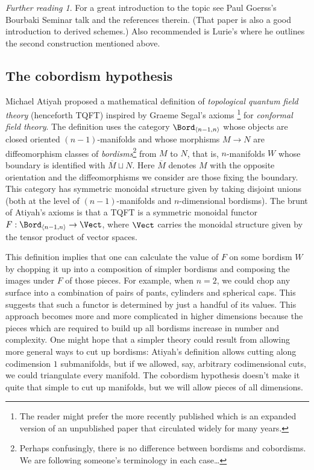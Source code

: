 \documentclass{conm-p-l}
\theoremstyle{definition} \newtheorem{definition}[theorem]{Definition}
\theoremstyle{remark} \newtheorem{remark}[theorem]{Remark}
\newtheorem*{further}{Further reading}
\numberwithin{equation}{section}
\begin{document}
\begin{further}
  For a great introduction to the topic see Paul Goerss's
  Bourbaki Seminar talk \cite{Goerss} and the references therein.
  (That paper is also a good introduction to derived schemes.)
  Also recommended is Lurie's \cite{LurieTMF} where he outlines the
  second construction mentioned above.
\end{further}


\subsection{The cobordism hypothesis}

Michael Atiyah \cite{Atiyah} proposed a mathematical definition of
\emph{topological quantum field theory} (henceforth TQFT) inspired by
Graeme Segal's axioms \cite{SegalCFT}\footnote{The reader might prefer
  the more recently published \cite{SegalCFT2} which is an expanded
  version of an unpublished paper that circulated widely for many
  years.} for \emph{conformal field theory}. The definition uses the
category $\Bord_{\langle n-1,n\rangle}$ whose objects are closed
oriented $(n-1)$-manifolds and whose morphisms $M \to N$ are
diffeomorphism classes of \emph{bordisms}\footnote{Perhaps
  confusingly, there is no difference between bordisms and
  cobordisms. We are following someone's terminology in each
  case\dots} from $M$ to $N$, that is, $n$-manifolds $W$ whose
boundary is identified with $\overline{M} \sqcup N$. Here
$\overline{M}$ denotes $M$ with the opposite orientation and the
diffeomorphisms we consider are those fixing the boundary.  This
category has symmetric monoidal structure given by taking disjoint
unions (both at the level of $(n-1)$-manifolds and $n$-dimensional
bordisms). The brunt of Atiyah's axioms is that a TQFT is a symmetric
monoidal functor $F : \Bord_{\langle n-1, n\rangle} \to \Vect$, where
$\Vect$ carries the monoidal structure given by the tensor product of
vector spaces.

This definition implies that one can calculate the value of $F$ on
some bordism $W$ by chopping it up into a composition of simpler
bordisms and composing the images under $F$ of those pieces. For
example, when $n=2$, we could chop any surface into a combination of
pairs of pants, cylinders and spherical caps. This suggests that such
a functor is determined by just a handful of its values. This approach
becomes more and more complicated in higher dimensions because the
pieces which are required to build up all bordisms increase in number
and complexity. One might hope that a simpler theory could result from
allowing more general ways to cut up bordisms: Atiyah's definition
allows cutting along codimension $1$ submanifolds, but if we allowed,
say, arbitrary codimensional cuts, we could triangulate every
manifold. The cobordism hypothesis doesn't make it quite that simple
to cut up manifolds, but we will allow pieces of all dimensions.
\end{document}
